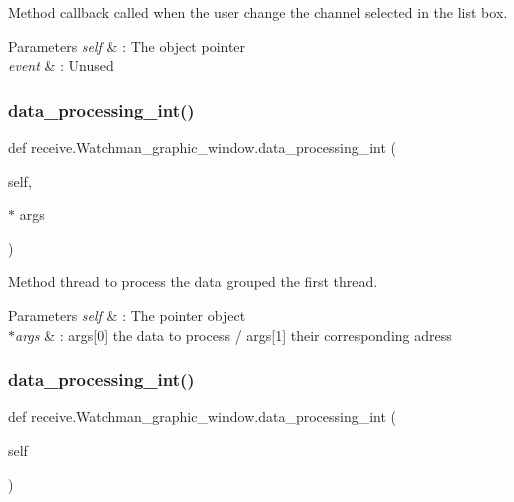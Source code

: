 Method callback called when the user change the channel selected in the list box. 


\begin{DoxyParams}{Parameters}
{\em self} & \+: The object pointer \\
\hline
{\em event} & \+: Unused \\
\hline
\end{DoxyParams}
\mbox{\label{classreceive_1_1_watchman__graphic__window_acb7c1aaa438d82608be5913143f2b60c}} 
\subsubsection{data\_processing\_int()\hspace{0.1cm}{\footnotesize\ttfamily [1/2]}}
{\footnotesize\ttfamily def receive.\+Watchman\+\_\+graphic\+\_\+window.\+data\+\_\+processing\+\_\+int (\begin{DoxyParamCaption}\item[{}]{self,  }\item[{$\ast$}]{args }\end{DoxyParamCaption})}



Method thread to process the data grouped the first thread. 


\begin{DoxyParams}{Parameters}
{\em self} & \+: The pointer object \\
\hline
{\em $\ast$args} & \+: args[0] the data to process / args[1] their corresponding adress \\
\hline
\end{DoxyParams}
\mbox{\label{classreceive_1_1_watchman__graphic__window_a1cac17a5de3d4dcb676ba2e6ca93e14a}} 
\subsubsection{data\_processing\_int()\hspace{0.1cm}{\footnotesize\ttfamily [2/2]}}
{\footnotesize\ttfamily def receive.\+Watchman\+\_\+graphic\+\_\+window.\+data\+\_\+processing\+\_\+int (\begin{DoxyParamCaption}\item[{}]{self }\end{DoxyParamCaption})}



